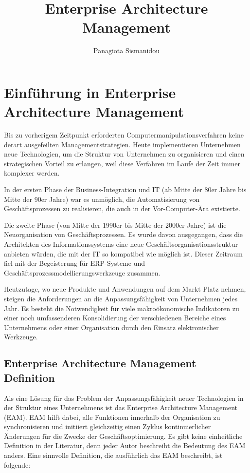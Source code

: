 \documentclass[
	doc,
	a4paper,
	helv
	]{apa6}
\title{Enterprise Architecture Management}
\author{Panagiota Sismanidou}
\begin{document}
\maketitle

\newpage
\tableofcontents

\newpage

\section{Einführung in Enterprise Architecture Management}

Bis zu vorherigem Zeitpunkt erforderten Computermanipulationsverfahren keine derart ausgefeilten Managementstrategien. Heute implementieren Unternehmen neue Technologien, um die Struktur von Unternehmen zu organisieren und einen strategischen Vorteil zu erlangen, weil diese Verfahren im Laufe der Zeit immer komplexer werden.

In der ersten Phase der Business-Integration und IT (ab Mitte der 80er Jahre bis Mitte der 90er Jahre) war es unmöglich, die Automatisierung von Geschäftsprozessen zu realisieren, die auch in der Vor-Computer-Ära existierte.

Die zweite Phase (von Mitte der 1990er bis Mitte der 2000er Jahre) ist die Neuorganisation von Geschäftsprozessen. Es wurde davon ausgegangen, dass die Architekten des Informationssystems eine neue Geschäftsorganisationsstruktur anbieten würden, die mit der IT so kompatibel wie möglich ist. Dieser Zeitraum fiel mit der Begeisterung für ERP-Systeme und Geschäftsprozessmodellierungswerkzeuge zusammen. 

Heutzutage, wo neue Produkte und Anwendungen auf dem Markt Platz nehmen, steigen die Anforderungen an die Anpassungsfähigkeit von Unternehmen jedes Jahr. Es besteht die Notwendigkeit für viele makroökonomische Indikatoren zu einer noch umfassenderen Konsolidierung der verschiedenen  Bereiche eines Unternehmens oder einer Organisation durch den Einsatz elektronischer Werkzeuge.

\subsection{Enterprise Architecture Management Definition}
Als eine Lösung für das Problem der Anpassungsfähigkeit neuer Technologien in der Struktur eines Unternehmens ist das Enterprise Architecture Management (EAM). EAM hilft dabei, alle Funktionen innerhalb der Organisation zu synchronisieren und initiiert gleichzeitig einen Zyklus kontinuierlicher Änderungen für die Zwecke der Geschäftsoptimierung. Es gibt keine einheitliche Definition in der Literatur, denn jeder Autor beschreibt die Bedeutung des EAM anders. Eine sinnvolle Definition, die ausführlich das EAM beschreibt, ist folgende:
\end{document}

